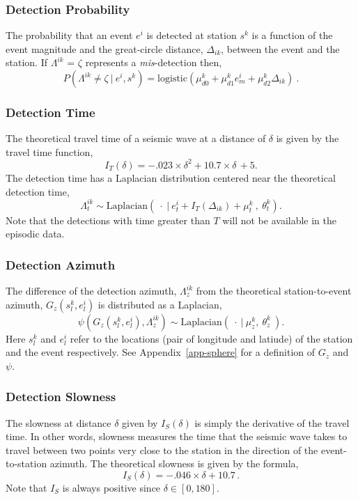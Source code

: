 \documentclass[12pt,letterpaper,onecolumn,oneside]{article}
\begin{document}
\subsubsection{Detection Probability}

The probability that an event $e^i$ is detected at station $s^k$ is a
function of the event magnitude and the great-circle distance,
$\Delta_{ik}$, between the event and the station. If $\Lambda^{ik}$ =
$\zeta$ represents a {\em mis}-detection then,
\[P(\Lambda^{ik} \ne \zeta \ | \ e^i , s^k) = \text{logistic}
(\mu_{d0}^k + \mu_{d1}^k e^i_m + \mu_{d2}^k \Delta_{ik}) \ .\]

\subsubsection{Detection Time}

The theoretical travel time of a seismic wave at a distance of $\delta$ is
given by the travel time function,
\[ I_T(\delta) = -.023 \times \delta^2 + 10.7 \times \delta\, + 5.\]
The detection time has a Laplacian distribution
 centered near the theoretical detection time,
\[ \Lambda_t^{ik} \sim \text{Laplacian}(\ \cdot \ | \ e^i_t + I_T(\Delta_{ik}) +
\mu_t^k \  , \ \theta_t^k) . \]
Note that the detections with time greater than $T$ will not be
available in the episodic data.

\subsubsection{Detection Azimuth}

The difference of the detection azimuth, $\Lambda_z^{ik}$ from the theoretical
station-to-event azimuth, $G_z(s^k_l, e^i_l)$  is distributed as a Laplacian,
\[\psi(G_z(s^k_l, e^i_l), \Lambda_z^{ik}) \sim \text{Laplacian}(\ \cdot
\ | \  \mu_z^k, \ \theta_z^k \ ) . \]
Here $s^k_l$ and $e^i_l$ refer to the locations (pair of longitude and
latiude) of the station and the event respectively. See
Appendix~\ref{app-sphere} for a definition of $G_z$ and $\psi$.

\subsubsection{Detection Slowness}
The slowness at distance $\delta$ given by $I_S(\delta)$ is simply the
derivative of the travel time. In other words, slowness measures
the time that the seismic wave takes to travel between two points very
close to the station in the direction of the event-to-station
azimuth. The theoretical slowness is given by the formula,
\[ I_S(\delta) = -.046 \times \delta + 10.7\, .\]
Note that $I_S$ is always positive since $\delta \in [0, 180]$.
\end{document}
